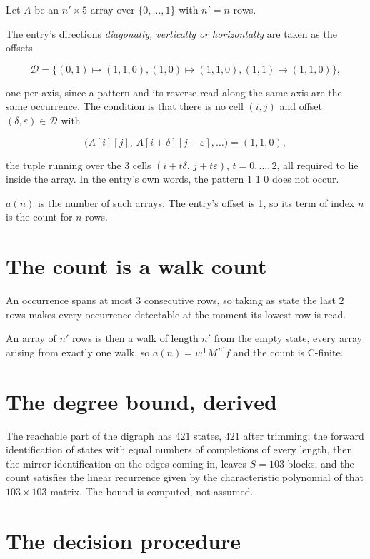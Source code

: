 \documentclass[11pt]{article}
\theoremstyle{definition}
\begin{document}
Let $A$ be an $n' \times 5$ array over $\{0,\dots,1\}$ with $n' = n$ rows.

The entry's directions {\itshape diagonally, vertically or horizontally} are taken as the offsets

\[\mathcal{D} = \{(0,1)\mapsto(1,1,0), (1,0)\mapsto(1,1,0), (1,1)\mapsto(1,1,0)\},\]

one per axis, since a pattern and its reverse read along the same axis are the same occurrence. The condition is that there is no cell $(i,j)$ and offset $(\delta,\varepsilon)\in\mathcal{D}$ with

\[\bigl(A[i][j],\,A[i{+}\delta][j{+}\varepsilon],\dots\bigr) = (1, 1, 0),\]

the tuple running over the $3$ cells $(i+t\delta,\,j+t\varepsilon)$, $t = 0,\dots,2$, all required to lie inside the array. In the entry's own words, the pattern 1 1 0 does not occur.

$a(n)$ is the number of such arrays. The entry's offset is 1, so its term of index $n$ is the count for $n$ rows.

\section{The count is a walk count}

An occurrence spans at most $3$ consecutive rows, so taking as state the last $2$ rows makes every occurrence detectable at the moment its lowest row is read.

An array of $n'$ rows is then a walk of length $n'$ from the empty state, every array arising from exactly one walk, so $a(n) = w^{\mathsf T}M^{\,n'}f$ and the count is C-finite.

\section{The degree bound, derived}

The reachable part of the digraph has $421$ states, $421$ after trimming; the forward identification of states with equal numbers of completions of every length, then the mirror identification on the edges coming in, leaves $S = 103$ blocks, and the count satisfies the linear recurrence given by the characteristic polynomial of that $103\times103$ matrix. The bound is computed, not assumed.

\section{The decision procedure}
\end{document}
